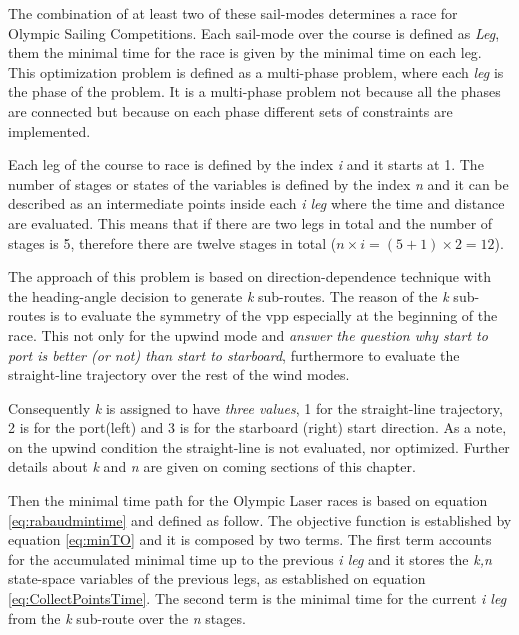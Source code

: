 The combination of at least two of these sail-modes determines a race for Olympic Sailing Competitions. Each sail-mode over the course is defined as \textit{Leg}, them the minimal time for the race is given by the minimal time on each leg. This optimization problem is defined as a multi-phase problem, where each \textit{leg} is the phase of the problem. It is a multi-phase problem not because all the phases are connected but because on each phase different sets of constraints are implemented.\par
Each leg of the course to race is defined by the index \textit{i} and it starts at 1. %
The number of stages or states of the variables is defined by the index \textit{n} and it can be described as an intermediate points inside each \textit{i leg} where the time and distance are evaluated.  This means that if there are two legs in total and the number of stages is 5, therefore there are twelve stages in total (\textit{$n \times i = (5+ 1) \times 2 = 12$}).\par 
The approach of this problem is based on direction-dependence technique with the heading-angle decision to generate \textit{k} sub-routes. The reason of the \textit{k} sub-routes is to evaluate the symmetry of the \acrshort{vpp} especially at the beginning of the race.
This not only for the upwind mode and \textit{answer the question why start to port is better (or not) than start to starboard}, furthermore to evaluate the straight-line trajectory over the rest of the wind modes. \par \noindent %
Consequently \textit{k} is assigned to have \textit{three values}, 1 for the straight-line trajectory, 2 is for the port(left) and 3 is for the starboard (right) start direction. As a note, on the upwind condition the straight-line is not evaluated, nor optimized. Further details about \textit{k} and \textit{n} are given on coming sections of this chapter.\par 
Then the minimal time path for the Olympic Laser races is based on equation \ref{eq:rabaudmintime} and defined as follow.
The objective function is established by equation \ref{eq:minTO} and it is composed by two terms. The first term accounts for the accumulated minimal time up to the previous \textit{i leg} and it stores the  \textit{k,n} state-space variables of the previous legs, as established on equation \ref{eq:CollectPointsTime}.
The second term is the minimal time for the current \textit{i leg} from the \textit{k} sub-route over the \textit{n} stages. \par \noindent 
